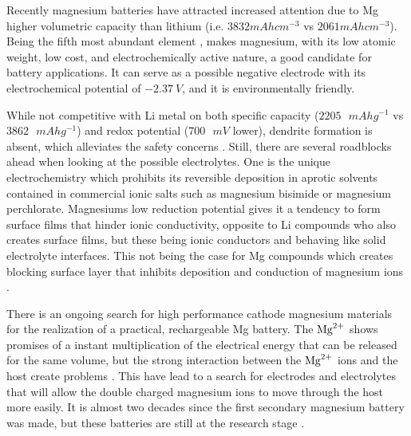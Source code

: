 	Recently magnesium batteries have attracted increased attention due to Mg higher volumetric capacity than lithium (i.e. $3832 \si{mAh cm^{-3}}$ vs $2061 \si{mAh cm^{-3}}$). Being the fifth most abundant element \cite{muldoon2012electrolyte}, makes magnesium, with its low atomic weight, low cost, and electrochemically active nature, a good candidate for battery applications. It can serve as a possible negative electrode with its electrochemical potential of $\SI{-2.37}{V}$, and it is environmentally friendly.

	 While not competitive with Li metal on both specific capacity ($2205\text{ } \si{mAh g^{-1}}$ vs $3862\text{ } \si{mAh g^{-1}}$) and redox potential ($700\text{ }\si{mV}$ lower), dendrite formation is absent, which alleviates the safety concerns \cite{aurbach2003nonaqueous}. Still, there are several roadblocks ahead when looking at the possible electrolytes. One is the unique electrochemistry which prohibits its reversible deposition in aprotic solvents contained in commercial ionic salts such as magnesium bisimide or magnesium perchlorate. Magnesiums low reduction potential gives it a tendency to form surface films  that hinder ionic conductivity, opposite to Li compounds who also creates surface films, but these being ionic conductors and behaving like solid electrolyte interfaces. This not being the case for Mg compounds which creates blocking surface layer that inhibits deposition and conduction of magnesium ions \cite{aurbach2001comparison} \cite{gnanaraj2003improving}.
	
	There is an ongoing search for high performance cathode magnesium materials for the realization of a practical, rechargeable Mg battery. The $\ce{Mg^2+}$ shows promises of a instant multiplication of the electrical energy that can be released for the same volume, but the strong interaction between the $\ce{Mg^2+}$ ions and the host create problems \cite{van2014rechargeable}. This have lead to a search for electrodes and electrolytes that will allow the double charged magnesium ions to move through the host more easily. It is almost two decades since the first secondary magnesium battery was made, but these batteries are still at the research stage \cite{attias2019anode}.





